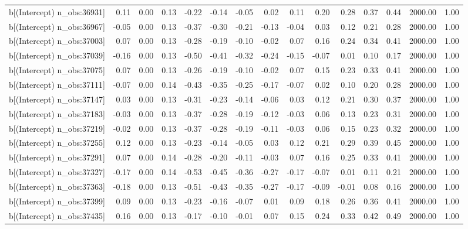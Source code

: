 \begin{table}[ht]
\begin{tabular}{rrrrrrrrrrrrrrr}
  b[(Intercept) n\_obs:36931] & 0.11 & 0.00 & 0.13 & -0.22 & -0.14 & -0.05 & 0.02 & 0.11 & 0.20 & 0.28 & 0.37 & 0.44 & 2000.00 & 1.00 \\ 
  b[(Intercept) n\_obs:36967] & -0.05 & 0.00 & 0.13 & -0.37 & -0.30 & -0.21 & -0.13 & -0.04 & 0.03 & 0.12 & 0.21 & 0.28 & 2000.00 & 1.00 \\ 
  b[(Intercept) n\_obs:37003] & 0.07 & 0.00 & 0.13 & -0.28 & -0.19 & -0.10 & -0.02 & 0.07 & 0.16 & 0.24 & 0.34 & 0.41 & 2000.00 & 1.00 \\ 
  b[(Intercept) n\_obs:37039] & -0.16 & 0.00 & 0.13 & -0.50 & -0.41 & -0.32 & -0.24 & -0.15 & -0.07 & 0.01 & 0.10 & 0.17 & 2000.00 & 1.00 \\ 
  b[(Intercept) n\_obs:37075] & 0.07 & 0.00 & 0.13 & -0.26 & -0.19 & -0.10 & -0.02 & 0.07 & 0.15 & 0.23 & 0.33 & 0.41 & 2000.00 & 1.00 \\ 
  b[(Intercept) n\_obs:37111] & -0.07 & 0.00 & 0.14 & -0.43 & -0.35 & -0.25 & -0.17 & -0.07 & 0.02 & 0.10 & 0.20 & 0.28 & 2000.00 & 1.00 \\ 
  b[(Intercept) n\_obs:37147] & 0.03 & 0.00 & 0.13 & -0.31 & -0.23 & -0.14 & -0.06 & 0.03 & 0.12 & 0.21 & 0.30 & 0.37 & 2000.00 & 1.00 \\ 
  b[(Intercept) n\_obs:37183] & -0.03 & 0.00 & 0.13 & -0.37 & -0.28 & -0.19 & -0.12 & -0.03 & 0.06 & 0.13 & 0.23 & 0.31 & 2000.00 & 1.00 \\ 
  b[(Intercept) n\_obs:37219] & -0.02 & 0.00 & 0.13 & -0.37 & -0.28 & -0.19 & -0.11 & -0.03 & 0.06 & 0.15 & 0.23 & 0.32 & 2000.00 & 1.00 \\ 
  b[(Intercept) n\_obs:37255] & 0.12 & 0.00 & 0.13 & -0.23 & -0.14 & -0.05 & 0.03 & 0.12 & 0.21 & 0.29 & 0.39 & 0.45 & 2000.00 & 1.00 \\ 
  b[(Intercept) n\_obs:37291] & 0.07 & 0.00 & 0.14 & -0.28 & -0.20 & -0.11 & -0.03 & 0.07 & 0.16 & 0.25 & 0.33 & 0.41 & 2000.00 & 1.00 \\ 
  b[(Intercept) n\_obs:37327] & -0.17 & 0.00 & 0.14 & -0.53 & -0.45 & -0.36 & -0.27 & -0.17 & -0.07 & 0.01 & 0.11 & 0.21 & 2000.00 & 1.00 \\ 
  b[(Intercept) n\_obs:37363] & -0.18 & 0.00 & 0.13 & -0.51 & -0.43 & -0.35 & -0.27 & -0.17 & -0.09 & -0.01 & 0.08 & 0.16 & 2000.00 & 1.00 \\ 
  b[(Intercept) n\_obs:37399] & 0.09 & 0.00 & 0.13 & -0.23 & -0.16 & -0.07 & 0.01 & 0.09 & 0.18 & 0.26 & 0.36 & 0.41 & 2000.00 & 1.00 \\ 
  b[(Intercept) n\_obs:37435] & 0.16 & 0.00 & 0.13 & -0.17 & -0.10 & -0.01 & 0.07 & 0.15 & 0.24 & 0.33 & 0.42 & 0.49 & 2000.00 & 1.00 \\ 

\end{tabular}
\end{table}
